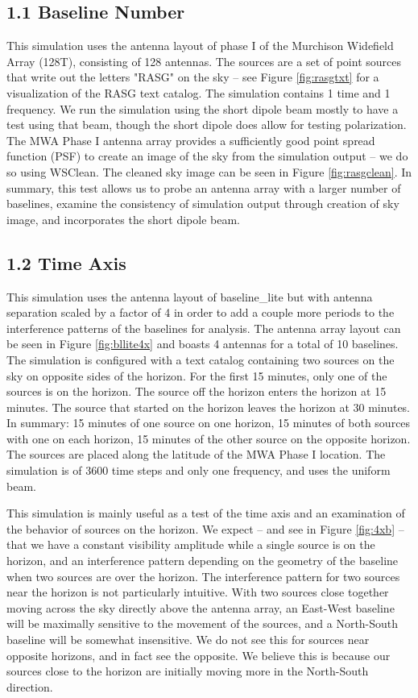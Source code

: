 \documentclass{article}
\begin{document}
\subsection*{1.1 Baseline Number}
This simulation uses the antenna layout of phase I of the Murchison Widefield Array (128T), consisting of 128 antennas. The sources are a set of point sources that write out the letters "RASG" on the sky -- see Figure \ref{fig:rasgtxt} for a visualization of the RASG text catalog. The simulation contains 1 time and 1 frequency. We run the simulation using the short dipole beam mostly to have a test using that beam, though the short dipole does allow for testing polarization. The MWA Phase I antenna array provides a sufficiently good point spread function (PSF) to create an image of the sky from the simulation output -- we do so using WSClean. The cleaned sky image can be seen in Figure \ref{fig:rasgclean}. In summary, this test allows us to probe an antenna array with a larger number of baselines, examine the consistency of simulation output through creation of sky image, and incorporates the short dipole beam.
\subsection*{1.2 Time Axis}

This simulation uses the antenna layout of baseline\_lite but with antenna separation scaled by a factor of 4 in order to add a couple more periods to the interference patterns of the baselines for analysis. The antenna array layout can be seen in Figure \ref{fig:bllite4x} and boasts 4 antennas for a total of 10 baselines. The simulation is configured with a text catalog containing two sources on the sky on opposite sides of the horizon. For the first 15 minutes, only one of the sources is on the horizon. The source off the horizon enters the horizon at 15 minutes. The source that started on the horizon leaves the horizon at 30 minutes. In summary: 15 minutes of one source on one horizon, 15 minutes of both sources with one on each horizon, 15 minutes of the other source on the opposite horizon. The sources are placed along the latitude of the MWA Phase I location. The simulation is of 3600 time steps and only one frequency, and uses the uniform beam.

This simulation is mainly useful as a test of the time axis and an examination of the behavior of sources on the horizon. We expect -- and see in Figure \ref{fig:4xb} -- that we have a constant visibility amplitude while a single source is on the horizon, and an interference pattern depending on the geometry of the baseline when two sources are over the horizon. The interference pattern for two sources near the horizon is not particularly intuitive. With two sources close together moving across the sky directly above the antenna array, an East-West baseline will be maximally sensitive to the movement of the sources, and a North-South baseline will be somewhat insensitive. We do not see this for sources near opposite horizons, and in fact see the opposite. We believe this is because our sources close to the horizon are initially moving more in the North-South direction.
\end{document}
